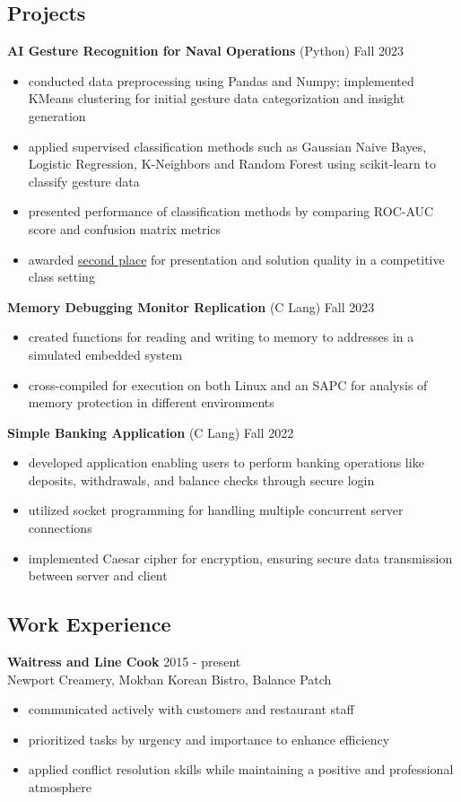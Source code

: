 \documentclass[11pt, letterpaper]{article}
\begin{document}
\subsection*{\color{accent} Projects \xdotfill[.5ex]{.4pt}}
\textbf{AI Gesture Recognition for Naval Operations}
\enspace\textbullet\enspace (Python)
\hfill Fall 2023
\begin{itemize}[noitemsep]
\item conducted data preprocessing using Pandas and Numpy; implemented KMeans clustering for initial gesture data categorization and insight generation
\item applied supervised classification methods such as Gaussian Naive Bayes, Logistic Regression, K-Neighbors and Random Forest using scikit-learn to classify gesture data
\item presented performance of classification methods by comparing ROC-AUC score and confusion matrix metrics
\item awarded \href{https://www.cs.umb.edu/~ding/history/470_670_fall_2023/student.htm}{second place} for presentation and solution quality in a competitive class setting
\end{itemize}
\textbf{Memory Debugging Monitor Replication}
\enspace\textbullet\enspace (C Lang)
\hfill Fall 2023
\begin{itemize}[noitemsep]
\item created functions for reading and writing to memory to addresses in a simulated embedded system
\item cross-compiled for execution on both Linux and an SAPC for analysis of memory protection in different environments
\end{itemize}
\textbf{Simple Banking Application}
\enspace\textbullet\enspace (C Lang)
\hfill Fall 2022
\begin{itemize}[noitemsep]
\item developed application enabling users to perform banking operations like deposits, withdrawals, and balance checks through secure login
\item utilized socket programming for handling multiple concurrent server connections
\item implemented Caesar cipher for encryption, ensuring secure data transmission between server and client
\end{itemize} 

\vspace{-3mm}
\subsection*{\color{accent} Work Experience \xdotfill[.5ex]{.4pt}}
\textbf{Waitress and Line Cook} \hfill 2015 - present \\
Newport Creamery, Mokban Korean Bistro, Balance Patch
\begin{itemize}[noitemsep]
\item communicated actively with customers and restaurant staff
\item prioritized tasks by urgency and importance to enhance efficiency
\item applied conflict resolution skills while maintaining a positive and professional atmosphere
\end{itemize}
\end{document}
